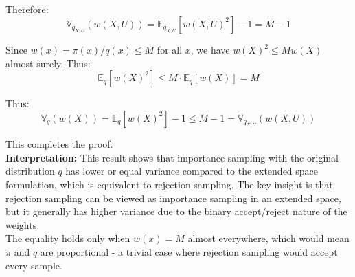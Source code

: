 Therefore:
\[
\mathbb{V}_{q_{X,U}}(w(X,U)) = \mathbb{E}_{q_{X,U}}[w(X,U)^2] - 1 = M - 1
\]

Since $w(x) = \pi(x)/q(x) \leq M$ for all $x$, we have $w(X)^2 \leq M w(X)$ almost surely. Thus:
\[
\mathbb{E}_q[w(X)^2]  \leq M \cdot \mathbb{E}_q[ w(X)] = M
\]


Thus:
\[
\mathbb{V}_q(w(X)) = \mathbb{E}_q[w(X)^2] - 1 \leq M - 1 = \mathbb{V}_{q_{X,U}}(w(X,U))
\]

This completes the proof.
\\[2mm]
\textbf{Interpretation:} This result shows that importance sampling with the
original distribution $q$ has lower or equal variance compared to the
extended space formulation, which is equivalent to rejection sampling.
The key insight is that rejection sampling can be viewed as importance
sampling in an extended space, but it generally has higher variance due
to the binary accept/reject nature of the weights.
\\[2mm]
The equality holds only when $w(x) = M$ almost everywhere, which would mean $\pi$ 
and $q$ are proportional - a trivial case where rejection sampling would accept every sample.
